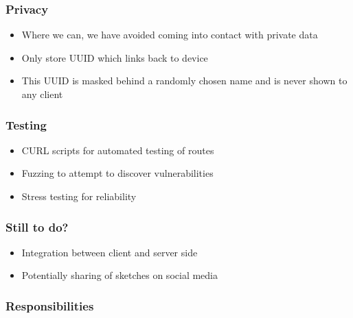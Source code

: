 \documentclass{beamer}
\begin{document}
  \begin{frame}
    \frametitle{Privacy}
    \begin{itemize}
      \item Where we can, we have avoided coming into contact with private data
      \item Only store UUID which links back to device
      \item This UUID is masked behind a randomly chosen name and is never shown to any client
    \end{itemize}
  \end{frame}

  \begin{frame}
    \frametitle{Testing}
    \begin{itemize}
      \item CURL scripts for automated testing of routes
      \item Fuzzing to attempt to discover vulnerabilities
      \item Stress testing for reliability
    \end{itemize}
  \end{frame}

  \begin{frame}
    \frametitle{Still to do?}
    \begin{itemize}
      \item Integration between client and server side
      \item Potentially sharing of sketches on social media
    \end{itemize}
  \end{frame}

  \begin{frame}
    \frametitle{Responsibilities}
  \end{frame}
\end{document}
